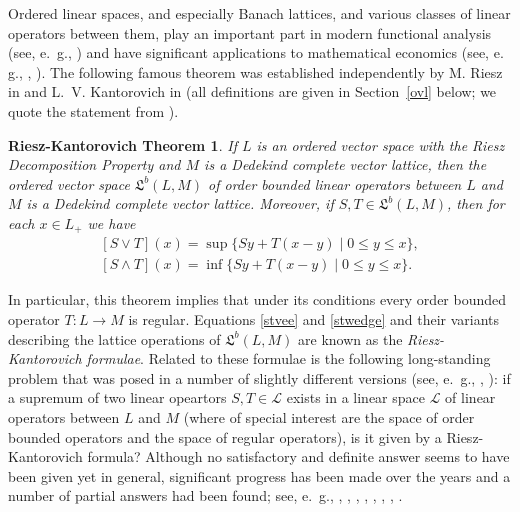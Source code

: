 \documentclass [a4paper, 12pt] {amsart}
\newtheorem* {theoremrieszkantorovich} {Riesz-Kantorovich Theorem}
\newcommand {\blinop} [2] {\ensuremath{\mathfrak L^b (#1, #2)}}
\begin{document}
Ordered linear spaces, and especially Banach lattices, and various classes of linear operators between them,
play an important part in modern functional analysis (see, e.~g., \cite {positiveoperators})
and have significant applications to mathematical economics (see, e. g., \cite {aliprantisetal2000ec}, \cite {aliprantisetal2000}).
The following famous theorem was established independently
by M. Riesz in \cite {riesz1940}
and L.~V. Kantorovich
in \cite {kantorovich1936}
(all definitions are given in Section~\ref {ovl} below; we quote the statement from \cite {aliprantistourky2002}).
\begin {theoremrieszkantorovich}
If $L$ is an ordered vector space with the Riesz Decomposition Property and $M$ is a Dedekind complete vector lattice,
then the ordered vector space $\blinop {L} {M}$ of order bounded linear operators between $L$ and $M$
is a Dedekind complete vector lattice.  Moreover, if $S, T \in \blinop {L} {M}$, then
for each $x \in L_+$ we have
\begin {gather}
\label {stvee}
[S \vee T] (x) = \sup \{S y + T (x - y) \mid 0 \leqslant y \leqslant x \},
\\
\label {stwedge}
[S \wedge T] (x) = \inf \{S y + T (x - y) \mid 0 \leqslant y \leqslant x \}.
\end {gather}
\end {theoremrieszkantorovich}
In particular, this theorem implies that under its conditions every order bounded operator $T : L \to M$ is regular.
Equations \eqref {stvee} and \eqref {stwedge} and their variants describing the lattice operations of $\blinop {L} {M}$
are known as the \emph {Riesz-Kantorovich formulae}.  Related to these formulae is the following long-standing problem
that was posed in a number of slightly different versions (see, e.~g., \cite [\S 2] {positiveoperators}, \cite {aliprantistourky2002}):
if a supremum of two linear opeartors $S, T \in \mathcal L$ exists in a linear space $\mathcal L$ of linear operators between $L$ and $M$
(where of special interest are the space of order bounded operators and the space of regular operators), is it given by a Riesz-Kantorovich formula?
Although no satisfactory and definite answer seems to have been given yet in general,
significant progress has been made over the years and a number of partial answers had been found; see, e.~g.,
\cite {abramovich1990}, \cite {abramovichgeyler1982}, \cite {abramovichwickstead1991}, \cite {abramovichwickstead1993},
\cite {abramovichwickstead1997}, \cite {rooij1985}, \cite {aliprantisetal2000}, \cite {aliprantistourky2002}.
\end{document}
